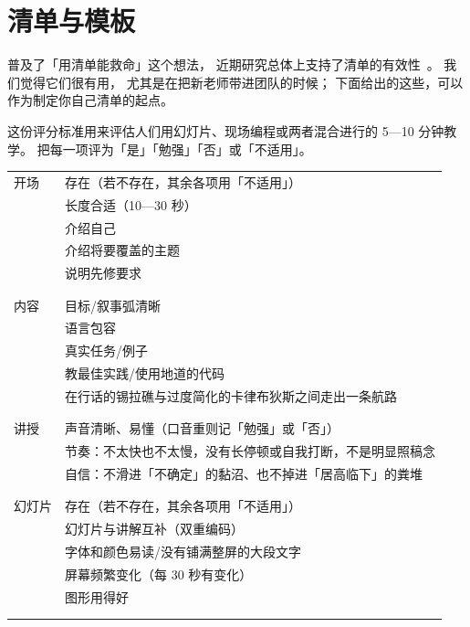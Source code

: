 \chapter{清单与模板}\label{s:checklist}

\cite{Gawa2007}普及了「用清单能救命」这个想法，
近期研究总体上支持了清单的有效性~\cite{Avel2013,Urba2014,Rams2019}。
我们觉得它们很有用，
尤其是在把新老师带进团队的时候；
下面给出的这些，可以作为制定你自己清单的起点。


这份评分标准用来评估人们用幻灯片、现场编程或两者混合进行的 5—10 分钟教学。
把每一项评为「是」「勉强」「否」或「不适用」。

\noindent
\begin{longtable}{p{}p{}}

  开场
  & 存在（若不存在，其余各项用「不适用」） \\
  & 长度合适（10—30 秒） \\
  & 介绍自己 \\
  & 介绍将要覆盖的主题 \\
  & 说明先修要求 \\
  \\ [-1.5ex] \hline \\ [-1.5ex]

  内容
  & 目标/叙事弧清晰 \\
  & 语言包容 \\
  & 真实任务/例子 \\
  & 教最佳实践/使用地道的代码 \\
  & 在行话的锡拉礁与过度简化的卡律布狄斯之间走出一条航路 \\
  \\ [-1.5ex] \hline \\ [-1.5ex]

  讲授
  & 声音清晰、易懂（口音重则记「勉强」或「否」） \\
  & 节奏：不太快也不太慢，没有长停顿或自我打断，不是明显照稿念 \\
  & 自信：不滑进「不确定」的黏沼、也不掉进「居高临下」的粪堆 \\
  \\ [-1.5ex] \hline \\ [-1.5ex]

  幻灯片
  & 存在（若不存在，其余各项用「不适用」） \\
  & 幻灯片与讲解互补（双重编码） \\
  & 字体和颜色易读/没有铺满整屏的大段文字 \\
  & 屏幕频繁变化（每 30 秒有变化） \\
  & 图形用得好 \\
  \\ [-1.5ex] \hline \\ [-1.5ex]


\end{longtable}
